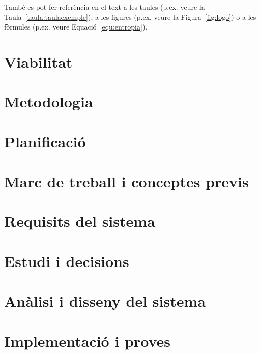 \documentclass[a4paper,12pt]{ThesisStyle}
\begin{document}
També es pot fer referència en el text a les taules (p.ex. veure la Taula~\ref{taula:taulaexemple}), a les figures (p.ex. veure la Figura~\ref{fig:logo})
o a les fòrmules (p.ex. veure Equació~\ref{equ:entropia}).



\chapter{Viabilitat}
\label{cap:viabilitat}



\chapter{Metodologia}
\label{cap:metodologia}



\chapter{Planificació}
\label{cap:planificacio}



\chapter{Marc de treball i conceptes previs}
\label{cap:marcdetreball}



\chapter{Requisits del sistema}
\label{cap:requisits}



\chapter{Estudi i decisions}
\label{cap:estudi}



\chapter{Anàlisi i disseny del sistema}
\label{cap:analisi}



\chapter{Implementació i proves}
\label{cap:implementacio}
\end{document}
